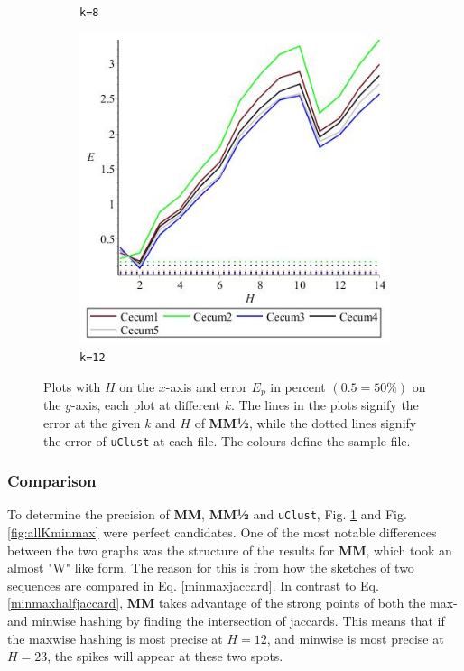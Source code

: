 \documentclass[../../main.tex]{subfiles}
\begin{document}
\begin{figure}[H]
\begin{subfigure}[b]{.5\textwidth}
\caption{\texttt{k=8}}
\end{subfigure}
\begin{subfigure}[b]{.5\textwidth}
\includegraphics[width=\textwidth]{precision/minmaxhalf/k12cecum}
\caption{\texttt{k=12}}
\end{subfigure}
\caption{Plots with $H$ on the $x$-axis and error $E_p$ in percent $(0.5 = 50\%)$ on the $y$-axis, each plot at different $k$. The lines in the plots signify the error at the given $k$ and $H$ of {\bf MM½}, while the dotted lines signify the error of \texttt{uClust} at each file. The colours define the sample file.}
\label{fig:allKminmaxhalf}
\end{figure}

\subsubsection{Comparison}
To determine the precision of {\bf MM}, {\bf MM½} and \texttt{uClust}, Fig. \ref{fig:allKminmaxhalf} and Fig. \ref{fig:allKminmax} were perfect candidates. One of the most notable differences between the two graphs was the structure of the results for {\bf MM}, which took an almost "W" like form. The reason for this is from how the sketches of two sequences are compared in Eq. \ref{minmaxjaccard}. In contrast to Eq. \ref{minmaxhalfjaccard}, {\bf MM} takes advantage of the strong points of both the max- and minwise hashing by finding the intersection of jaccards. This means that if the maxwise hashing is most precise at $H=12$, and minwise is most precise at $H=23$, the spikes will appear at these two spots.\\
\end{document}
